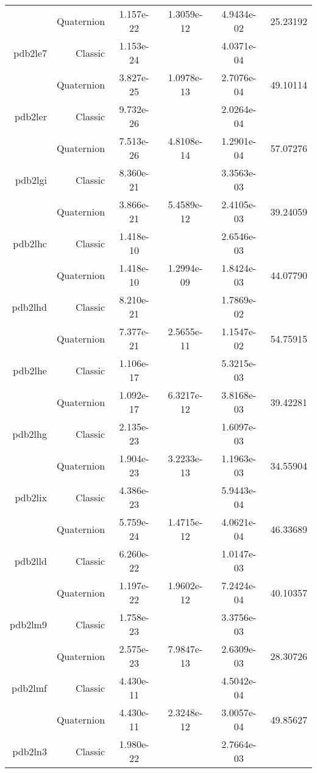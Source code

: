 \begin{xltabular}{\textwidth}{r|rS[table-format=1.3e+2]S[table-format=1.4e+2]S[table-format=1.4e+2]S[table-format=-1.5]}
& Quaternion & 1.157e-22 & 1.3059e-12 & 4.9434e-02 & 25.23192\\  \addlinespace
pdb2le7 & Classic & 1.153e-24 &  & 4.0371e-04 & \\
& Quaternion & 3.827e-25 & 1.0978e-13 & 2.7076e-04 & 49.10114\\  \addlinespace
pdb2ler & Classic & 9.732e-26 &  & 2.0264e-04 & \\
& Quaternion & 7.513e-26 & 4.8108e-14 & 1.2901e-04 & 57.07276\\  \addlinespace
pdb2lgi & Classic & 8.360e-21 &  & 3.3563e-03 & \\
& Quaternion & 3.866e-21 & 5.4589e-12 & 2.4105e-03 & 39.24059\\  \addlinespace
pdb2lhc & Classic & 1.418e-10 &  & 2.6546e-03 & \\
& Quaternion & 1.418e-10 & 1.2994e-09 & 1.8424e-03 & 44.07790\\  \addlinespace
pdb2lhd & Classic & 8.210e-21 &  & 1.7869e-02 & \\
& Quaternion & 7.377e-21 & 2.5655e-11 & 1.1547e-02 & 54.75915\\  \addlinespace
pdb2lhe & Classic & 1.106e-17 &  & 5.3215e-03 & \\
& Quaternion & 1.092e-17 & 6.3217e-12 & 3.8168e-03 & 39.42281\\  \addlinespace
pdb2lhg & Classic & 2.135e-23 &  & 1.6097e-03 & \\
& Quaternion & 1.904e-23 & 3.2233e-13 & 1.1963e-03 & 34.55904\\  \addlinespace
pdb2lix & Classic & 4.386e-23 &  & 5.9443e-04 & \\
& Quaternion & 5.759e-24 & 1.4715e-12 & 4.0621e-04 & 46.33689\\  \addlinespace
pdb2lld & Classic & 6.260e-22 &  & 1.0147e-03 & \\
& Quaternion & 1.197e-22 & 1.9602e-12 & 7.2424e-04 & 40.10357\\  \addlinespace
pdb2lm9 & Classic & 1.758e-23 &  & 3.3756e-03 & \\
& Quaternion & 2.575e-23 & 7.9847e-13 & 2.6309e-03 & 28.30726\\  \addlinespace
pdb2lmf & Classic & 4.430e-11 &  & 4.5042e-04 & \\
& Quaternion & 4.430e-11 & 2.3248e-12 & 3.0057e-04 & 49.85627\\  \addlinespace
pdb2ln3 & Classic & 1.980e-22 &  & 2.7664e-03 & \\

\end{xltabular}
